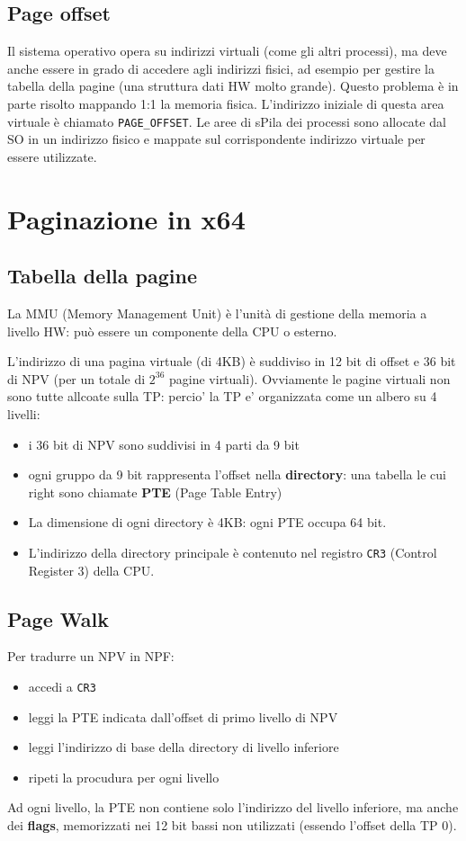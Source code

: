 \documentclass[12pt, a4paper]{report}
\begin{document}
\subsection{Page offset}
Il sistema operativo opera su indirizzi virtuali (come gli altri processi), ma
deve anche essere in grado di accedere agli indirizzi fisici, ad esempio per
gestire la tabella della pagine (una struttura dati HW molto grande). Questo
problema è in parte risolto mappando 1:1 la memoria fisica. L'indirizzo
iniziale di questa area virtuale è chiamato \texttt{PAGE\_OFFSET}.
Le aree di sPila dei processi sono allocate dal SO in un indirizzo fisico e
mappate sul corrispondente indirizzo virtuale per essere utilizzate.
\section{Paginazione in x64}
\subsection{Tabella della pagine}
La MMU (Memory Management Unit) è l'unità di gestione della memoria a livello
HW: può essere un componente della CPU o esterno.

L'indirizzo di una pagina virtuale (di 4KB) è suddiviso in 12 bit di offset e
36 bit di NPV (per un totale di $2^{36}$ pagine virtuali). Ovviamente le pagine
virtuali non sono tutte allcoate sulla TP: percio' la TP e' organizzata come un
albero su 4 livelli:
\begin{itemize}
	\item i 36 bit di NPV sono suddivisi in 4 parti da 9 bit
	\item ogni gruppo da 9 bit rappresenta l'offset nella \textbf{directory}:
		una tabella le cui right sono chiamate \textbf{PTE} (Page Table Entry)
	\item La dimensione di ogni directory è 4KB: ogni PTE occupa 64 bit.
	\item L'indirizzo della directory principale è contenuto nel registro
		\texttt{CR3} (Control Register 3) della CPU.
\end{itemize}
\subsection{Page Walk}
Per tradurre un NPV in NPF:
\begin{itemize}
	\item accedi a \texttt{CR3}
	\item leggi la PTE indicata dall'offset di primo livello di NPV
	\item leggi l'indirizzo di base della directory di livello inferiore
	\item ripeti la procudura per ogni livello
\end{itemize}
Ad ogni livello, la PTE non contiene solo l'indirizzo del livello inferiore, ma
anche dei \textbf{flags}, memorizzati nei 12 bit bassi non utilizzati (essendo
l'offset della TP 0).
\end{document}
